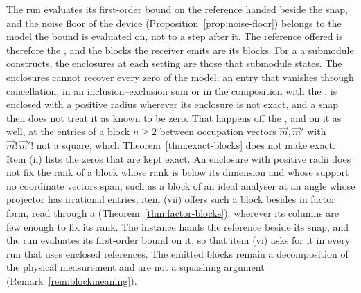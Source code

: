 The run evaluates its first-order bound on the reference handed beside the
snap, and the noise floor of the device (Proposition~\ref{prop:noise-floor})
belongs to the model the bound is evaluated on, not to a step after it. The
reference offered is therefore the , and the
blocks the receiver emits are its blocks. For a  a
submodule constructs, the enclosures at each setting are those that submodule states.
The
enclosures cannot recover every zero of the model: an entry that vanishes
through cancellation, in an inclusion--exclusion sum or in the composition
with the , is enclosed with a positive radius wherever its
enclosure is not exact, and a snap then does not treat it as known to be
zero. That happens off the , and on it as well, at the
entries of a block $n\ge2$ between occupation vectors $\vec m,\vec m'$ with
$\vec m!\,\vec m'!$ not a square, which
Theorem~\ref{thm:exact-blocks} does not make exact. Item (ii) lists the zeros
that are kept exact. An enclosure with positive radii does not fix the rank
of a block whose rank is below its dimension and whose support no coordinate
vectors span, such as a block of an ideal analyser at an angle whose
projector has irrational entries; item (vii) offers such a block besides in
factor form, read through a 
(Theorem~\ref{thm:factor-blocks}), wherever its columns are few enough to fix
its rank. The instance hands the reference beside its snap, and
the run evaluates its first-order bound on it, so that item (vi) asks for it
in every run that uses enclosed references. The emitted blocks remain a decomposition of the physical
measurement and are not a squashing argument (Remark~\ref{rem:blockmeaning}).

